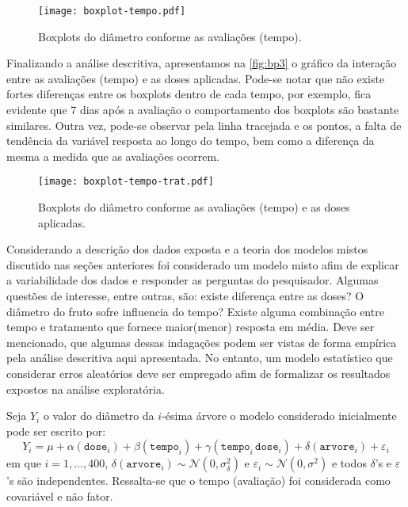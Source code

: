 \documentclass[12pt,a4paper,final]{article}
\begin{document}
\begin{figure}[H]
\centering
\texttt{[image: boxplot-tempo.pdf]}
\caption{Boxplots do diâmetro conforme as avaliações (tempo).}
\label{fig:bp2}
\end{figure}

Finalizando a análise descritiva, apresentamos na \autoref{fig:bp3} o gráfico da interação entre as avaliações 
(tempo) e as doses aplicadas. Pode-se notar que não existe fortes diferenças entre os boxplots dentro de cada tempo,
por exemplo, fica evidente que 7 dias após a avaliação o comportamento dos boxplots são bastante similares. 
Outra vez, pode-se observar pela linha tracejada e os pontos, a falta de tendência da variável resposta ao longo do
tempo, bem como a diferença da  mesma a medida que as avaliações ocorrem.

\begin{figure}[H]
	\centering
	\texttt{[image: boxplot-tempo-trat.pdf]}
	\caption{Boxplots do diâmetro conforme as avaliações (tempo) e as doses aplicadas.}
	\label{fig:bp3}
\end{figure}

Considerando a descrição dos dados exposta e a teoria dos modelos mistos discutido nas seções anteriores foi considerado
um modelo misto afim de explicar a variabilidade dos dados e responder as perguntas do pesquisador. Algumas questões
de interesse, entre outras, são: existe diferença entre as doses? O diâmetro do fruto sofre influencia do tempo? 
Existe alguma combinação entre tempo e tratamento que fornece maior(menor) resposta em média. Deve ser mencionado,
que algumas dessas indagações podem ser vistas de forma empírica pela análise descritiva aqui apresentada. No entanto,
um modelo estatístico que considerar erros aleatórios deve ser empregado afim de formalizar os resultados expostos
na análise exploratória.

Seja $ Y_i $ o valor do diâmetro da $ i $-ésima árvore o modelo considerado inicialmente pode ser escrito por:
\begin{equation}\label{eq:mod1}
Y_i = \mu + \alpha(\texttt{dose}_i) + \beta(\texttt{tempo}_i) + \gamma(\texttt{tempo}_i\,\texttt{dose}_i) + 
\delta(\texttt{arvore}_i) + \varepsilon_i
\end{equation}
em que $ i = 1, \ldots, 400 $, $\delta(\texttt{arvore}_i) \sim \mathcal{N}(0, \sigma^2_\delta)$ e $\varepsilon_i \sim \mathcal{N}(0, \sigma^2)$ e todos $\delta$'s e $\varepsilon$'s são independentes. Ressalta-se que o tempo (avaliação) foi
considerada como covariável e não fator.
\end{document}
